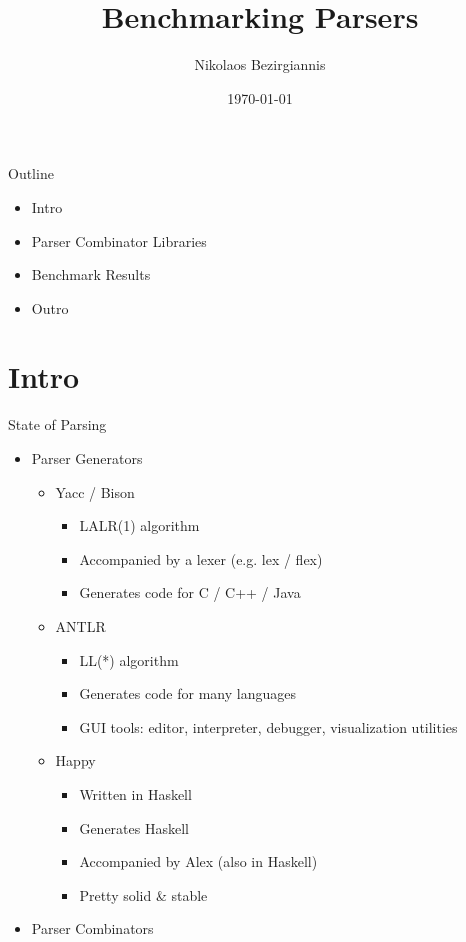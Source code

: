 \documentclass{beamer}
\title{Benchmarking Parsers}
\author{Nikolaos Bezirgiannis}
\date{\today}
\begin{document}
\begin{frame}
\titlepage
\end{frame}

\begin{frame}{Outline}
\begin{itemize}
\item Intro
\item Parser Combinator Libraries
\item Benchmark Results
\item Outro
\end{itemize}
\end{frame}

\section{Intro}

\begin{frame}{State of Parsing}
\begin{itemize}
\item Parser Generators
  \pause
  \begin{itemize}
    \item Yacc / Bison
      \begin{itemize}
        \item LALR(1) algorithm
        \item Accompanied by a lexer (e.g. lex / flex)
        \item Generates code for C / C++ / Java
      \end{itemize}
      \pause
    \item ANTLR
      \begin{itemize}
        \item LL(*) algorithm
        \item Generates code for many languages
        \item GUI tools: editor, interpreter, debugger, visualization utilities
      \end{itemize}
      \pause
    \item Happy
      \begin{itemize}
        \item Written in Haskell
        \item Generates Haskell
        \item Accompanied by Alex (also in Haskell)
        \item Pretty solid \& stable
      \end{itemize}
  \end{itemize}
  \pause
\item Parser Combinators
\end{itemize}
\end{frame}
\end{document}
